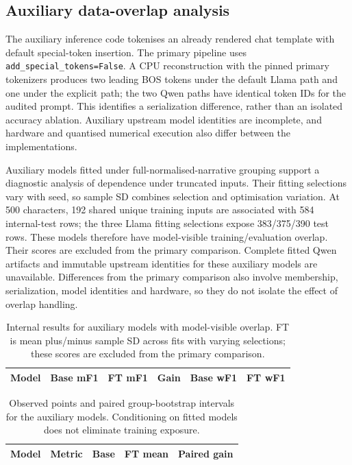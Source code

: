 \documentclass[10pt,a4paper]{article}
\begin{document}
\subsection{Auxiliary data-overlap analysis}
The auxiliary inference code tokenises an already rendered chat template with default special-token insertion. The primary pipeline uses \texttt{add\_special\_tokens=False}. A CPU reconstruction with the pinned primary tokenizers produces two leading BOS tokens under the default Llama path and one under the explicit path; the two Qwen paths have identical token IDs for the audited prompt. This identifies a serialization difference, rather than an isolated accuracy ablation. Auxiliary upstream model identities are incomplete, and hardware and quantised numerical execution also differ between the implementations.

Auxiliary models fitted under full-normalised-narrative grouping support a diagnostic analysis of dependence under truncated inputs. Their fitting selections vary with seed, so sample SD combines selection and optimisation variation. At 500 characters, 192 shared unique training inputs are associated with 584 internal-test rows; the three Llama fitting selections expose 383/375/390 test rows. These models therefore have model-visible training/evaluation overlap. Their scores are excluded from the primary comparison. Complete fitted Qwen artifacts and immutable upstream identities for these auxiliary models are unavailable. Differences from the primary comparison also involve membership, serialization, model identities and hardware, so they do not isolate the effect of overlap handling.
\begin{table}[H]\centering\small
\caption{Internal results for auxiliary models with model-visible overlap. FT is mean plus/minus sample SD across fits with varying selections; these scores are excluded from the primary comparison.}\label{sup:historical-internal}
\begin{tabular}{lrrrrr}\toprule Model & Base mF1 & FT mF1 & Gain & Base wF1 & FT wF1\\\midrule
\end{tabular}\end{table}
\begin{table}[H]\centering\footnotesize
\caption{Observed points and paired group-bootstrap intervals for the auxiliary models. Conditioning on fitted models does not eliminate training exposure.}\label{sup:historical-ci}
\begin{tabular}{llrrr}\toprule Model & Metric & Base & FT mean & Paired gain\\\midrule
\end{tabular}\end{table}
\end{document}
